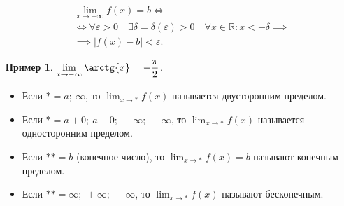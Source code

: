 \documentclass[a4paper,12pt]{article} %
\theoremstyle{remark}
\theoremstyle{definition}
\newtheorem{exmp}{Пример}[section]
\begin{document}
	\begin{multline}
		\lim_{x \to -\infty} f(x) = b \iff \\
		\iff \forall \varepsilon > 0 \quad \exists \delta=\delta(\varepsilon) > 0 \quad \forall x\in \mathbb{R} : x < -\delta \implies \\
	\implies |f(x) - b| < \varepsilon.
	\end{multline}
	\begin{exmp}
		$\displaystyle \lim_{x \to -\infty} \arctg{x} = - \frac{\pi}{2}$.
	\end{exmp}
\begin{itemize}
    \item Если $* = a; \ \infty$, то $\displaystyle \lim_{x \to *} f(x)$ называется двусторонним пределом.
    \item Если $* = a+0; \ a-0;\ +\infty;\ -\infty$, то $\displaystyle \lim_{x \to *} f(x)$ называется односторонним пределом.
    \item Если $** = b$ (конечное число), то $\displaystyle \lim_{x \to *} f(x) = b$ называют конечным пределом.
    \item Если $** = \infty;\ +\infty;\ -\infty$, то $\displaystyle \lim_{x \to *} f(x)$ называют бесконечным.
\end{itemize}
\end{document}
